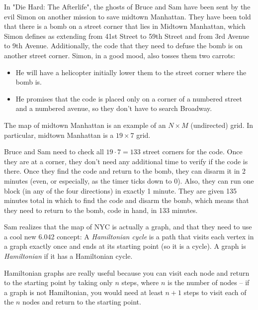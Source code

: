 \documentclass[twoside,12pt]{article}
\begin{document}
\begin{problem}[20 points]

In "Die Hard: The Afterlife", the ghosts of Bruce and Sam have been
sent by the evil Simon on another mission to save  midtown
Manhattan. They have been told that there is a bomb on a street
corner that lies in Midtown Manhattan, which Simon defines as
extending from 41st Street to 59th Street and from 3rd Avenue to 9th
Avenue. Additionally, the code that they need to defuse the bomb is
on another street corner. Simon, in a good mood, also tosses them
two carrots:
\begin{itemize}
\item He will have a helicopter initially lower them to the street corner where the bomb is.
\item He promises that the code is placed only on a corner of a numbered
street and a numbered avenue, so they don't have to search Broadway.
\end{itemize}

The map of midtown Manhattan is an example of an $N \times M$
(undirected) grid.  In particular, midtown Manhattan is a $19 \times
7$ grid.


Bruce and Sam need to check all $19 \cdot 7 = 133$ street corners
for the code.  Once they are at a corner, they don't need any
additional time to verify if the code is there.  Once they find the
code and return to the bomb, they can disarm it in 2 minutes (even,
or especially, as the timer ticks down to 0). Also, they can run one
block (in any of the four directions) in exactly 1 minute.
They are given 135 minutes total in which to find the code and
disarm the bomb, which means that they need to return to the bomb,
code in hand, in 133 minutes.

Sam realizes that the map of NYC is actually a graph, and that they
need to use a cool new 6.042 concept: A {\em Hamiltonian cycle} is a
path that visits each vertex in a graph exactly once and ends at its
starting point (so it is a cycle). A graph is {\em Hamiltonian} if
it has a Hamiltonian cycle.

Hamiltonian graphs are really useful because you can visit each node
and return to the starting point by taking only $n$ steps, where $n$
is the number of nodes -- if a graph is not Hamiltonian, you would
need at least $n+1$ steps to visit each of the $n$ nodes and return
to the starting point.


\end{problem}
\end{document}
